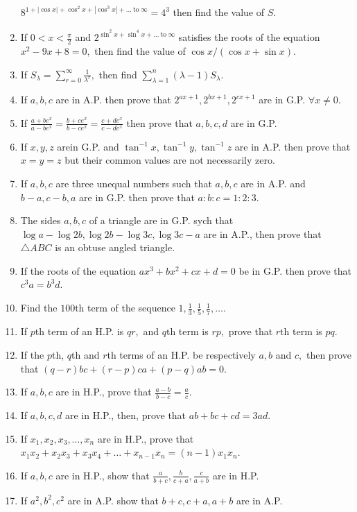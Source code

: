 \begin{enumerate}
  $8^{1 + |\cos x| + \cos^2x + |\cos^3x| + \ldots~\text{to}~\infty} = 4^3$ then find the value of $S$.
\item If $0 < x <\frac{\pi}{2}$ and $2^{\sin^2x + \sin^4x + \ldots~\text{to}~\infty}$ satisfies the roots of the equation
  $x^2 - 9x + 8 = 0,$ then find the value of $\cos x/(\cos x + \sin x)$.
\item If $S_\lambda = \sum_{r=0}^\infty \frac{1}{\lambda^r},$ then find $\sum_{\lambda = 1}^n(\lambda - 1)S_\lambda$.
\item If $a, b, c$ are in A.P. then prove that $2^{ax + 1}, 2^{bx + 1}, 2^{cx + 1}$ are in G.P. $\forall x\neq 0$.
\item If $\frac{a + be^x}{a - be^x} = \frac{b + ce^x}{b - ce^x} = \frac{c + de^x}{c - de^x}$ then prove that $a, b, c, d$
  are in G.P.
\item If $x, y, z$ arein G.P. and $\tan^{-1}x, \tan^{-1}y, \tan^{-1}z$ are in A.P. then prove that $x = y = z$ but their
  common values are not necessarily zero.
\item If $a, b, c$ are three unequal numbers such that $a, b, c$ are in A.P. and $b - a, c - b, a$ are in G.P. then prove
  that $a:b:c = 1:2:3$.
\item The sides $a,b,c$ of a triangle are in G.P. sych that $\log a - \log 2b, \log 2b - \log 3c, \log 3c - a$ are in
  A.P., then prove that $\triangle ABC$ is an obtuse angled triangle.
\item If the roots of the equation $ax^3 + bx^2 + cx + d = 0$ be in G.P. then prove that $c^3a = b^3d$.
\item Find the $100$th term of the sequence $1, \frac{1}{3}, \frac{1}{5}, \frac{1}{7}, \ldots$.
\item If $p$th term of an H.P. is $qr,$ and $q$th term is $rp,$ prove that $r$th term is $pq$.
\item If the $p$th, $q$th and $r$th terms of an H.P. be respectively $a, b$ and $c,$ then prove that $(q - r)bc + (r - p)ca + (p -
  q)ab = 0$.
\item If $a, b, c$ are in H.P., prove that $\frac{a - b}{b - c} = \frac{a}{c}$.
\item If $a, b, c, d$ are in H.P., then, prove that $ab + bc + cd = 3ad$.
\item If $x_1, x_2, x_3, \ldots, x_n$ are in H.P., prove that $x_1x_2 + x_2x_3 + x_3x_4 + \ldots + x_{n - 1}x_n = (n - 1)x_1x_n$.
\item If $a, b, c$ are in H.P., show that $\frac{a}{b + c}, \frac{b}{c + a}, \frac{c}{a + b}$ are in H.P.
\item If $a^2, b^2, c^2$ are in A.P. show that $b + c, c + a, a + b$ are in A.P.

\end{enumerate}
